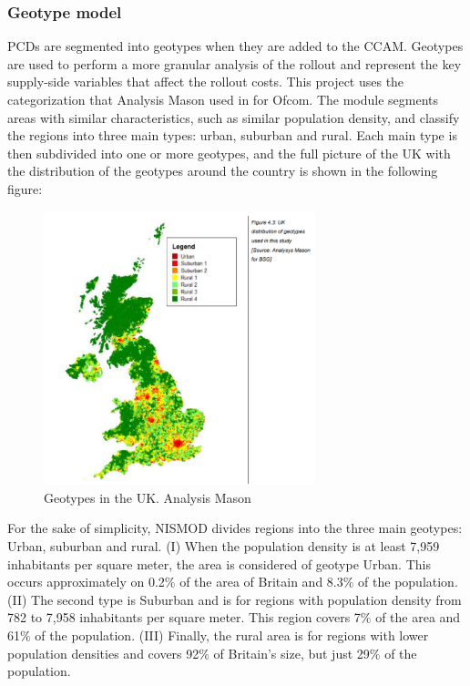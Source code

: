 \subsubsection*{Geotype model}
PCDs are segmented into geotypes when they are added to the CCAM. Geotypes are used to perform a more granular analysis of the rollout and represent the key supply-side variables that affect the rollout costs. This project uses the categorization that Analysis Mason used in \cite{3-011} for Ofcom. The module segments areas with similar characteristics, such as similar population density, and classify the regions into three main types: urban, suburban and rural. Each main type is then subdivided into one or more geotypes, and the full picture of the UK with the distribution of the geotypes around the country is shown in the following figure:
\begin{figure}[H]
	\begin{Center}
		\includegraphics[width=0.7\textwidth]{./media/image16.png}
		\caption{Geotypes in the UK. Analysis Mason\cite{3-11}}
	\end{Center}
\end{figure}
For the sake of simplicity, NISMOD divides regions into the three main geotypes: Urban, suburban and rural. (I) When the population density is at least 7,959 inhabitants per square meter, the area is considered of geotype Urban. This occurs approximately on 0.2$\%$  of the area of Britain and 8.3$\%$  of the population. (II) The second type is Suburban and is for regions with population density from 782 to 7,958 inhabitants per square meter. This region covers 7$\%$  of the area and 61$\%$  of the population. (III) Finally, the rural area is for regions with lower population densities and covers 92$\%$  of Britain’s size, but just 29$\%$  of the population.\par

